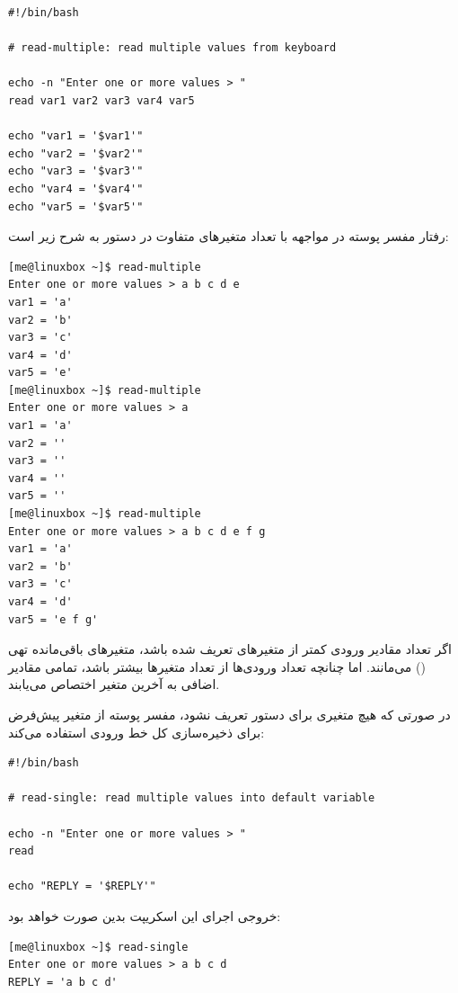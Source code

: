 \begin{latin}
\begin{lstlisting}
#!/bin/bash

# read-multiple: read multiple values from keyboard

echo -n "Enter one or more values > "
read var1 var2 var3 var4 var5

echo "var1 = '$var1'"
echo "var2 = '$var2'"
echo "var3 = '$var3'"
echo "var4 = '$var4'"
echo "var5 = '$var5'"
\end{lstlisting}
\end{latin}

رفتار مفسر پوسته در مواجهه با تعداد متغیرهای متفاوت در دستور  به شرح زیر است:

\begin{latin}
\begin{lstlisting}
[me@linuxbox ~]$ read-multiple
Enter one or more values > a b c d e
var1 = 'a'
var2 = 'b'
var3 = 'c'
var4 = 'd'
var5 = 'e'
[me@linuxbox ~]$ read-multiple
Enter one or more values > a
var1 = 'a'
var2 = ''
var3 = ''
var4 = ''
var5 = ''
[me@linuxbox ~]$ read-multiple
Enter one or more values > a b c d e f g
var1 = 'a'
var2 = 'b'
var3 = 'c'
var4 = 'd'
var5 = 'e f g'
\end{lstlisting}
\end{latin}

اگر تعداد مقادیر ورودی کمتر از متغیرهای تعریف شده باشد، متغیرهای باقی‌مانده تهی () می‌مانند. اما چنانچه تعداد ورودی‌ها از تعداد متغیرها بیشتر باشد، تمامی مقادیر اضافی به آخرین متغیر اختصاص می‌یابند.

در صورتی که هیچ متغیری برای دستور  تعریف نشود، مفسر پوسته از متغیر پیش‌فرض  برای ذخیره‌سازی کل خط ورودی استفاده می‌کند:

\begin{latin}
\begin{lstlisting}
#!/bin/bash

# read-single: read multiple values into default variable

echo -n "Enter one or more values > "
read

echo "REPLY = '$REPLY'"
\end{lstlisting}
\end{latin}

خروجی اجرای این اسکریپت بدین صورت خواهد بود:

\begin{latin}
\begin{lstlisting}
[me@linuxbox ~]$ read-single
Enter one or more values > a b c d
REPLY = 'a b c d'
\end{lstlisting}
\end{latin}

